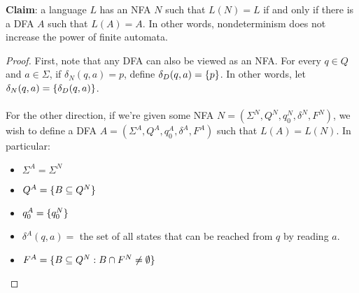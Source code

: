 \documentclass[]{article}
\DeclarePairedDelimiter{\set}{\lbrace}{\rbrace}
\theoremstyle{definition}
\begin{document}
          \textbf{Claim}: a language $L$ has an NFA $N$ such that $L(N) = L$ if and only if there is a DFA $A$ such that $L(A) = A$. In other words, nondeterminism does not increase the power of finite automata.

          \begin{proof}
            First, note that any DFA can also be viewed as an NFA. For every $q \in Q$ and $a \in \Sigma$, if $\delta_N(q, a) = p$, define $\delta_D(q, a) = \set{p}$. In other words, let $\delta_N(q, a) = \set{\delta_D(q, a)}$.
            \\ \\
            For the other direction, if we're given some NFA $N = (\Sigma^N, Q^N, q_0^N, \delta^N, F^N)$, we wish to define a DFA $A = (\Sigma^A, Q^A, q_0^A, \delta^A, F^A)$ such that $L(A) = L(N)$. In particular:
            \begin{itemize}
              \item $\Sigma^A = \Sigma^N$
              \item $Q^A = \set{ B \subseteq Q^N }$
              \item $q_0^A = \set{ q_0^N }$
              \item $\delta^A(q, a) = $ the set of all states that can be reached from $q$ by reading $a$.
              \item $F^A = \set{ B \subseteq Q^N : B \cap F^N \ne \emptyset }$
            \end{itemize}
          \end{proof}
\end{document}
